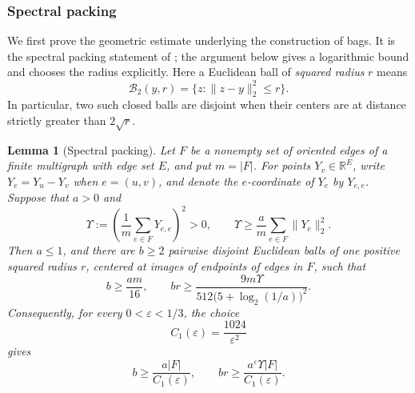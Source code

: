 \documentclass[11pt]{amsart}
\newtheorem{lemma}[theorem]{Lemma}
\theoremstyle{definition}
\theoremstyle{remark}
\numberwithin{equation}{section}
\begin{document}
\subsubsection{Spectral packing}
\label{hb:spectral-subsection}

We first prove the geometric estimate underlying the construction of
bags.  It is the spectral packing statement of
\cite[Lemma~6.4]{AOG}; the argument below gives a logarithmic bound and
chooses the radius explicitly.
Here a Euclidean ball of \emph{squared radius} \(r\) means
\[
 \mathcal B_2(y,r)=\{z:\|z-y\|_2^2\le r\}.
\]
In particular, two such closed balls are disjoint when their centers
are at distance strictly greater than \(2\sqrt r\).

\begin{lemma}[Spectral packing]\label{hb:spectral-packing}
Let \(F\) be a nonempty set of oriented edges of a finite multigraph
with edge set \(E\), and put \(m=|F|\).
For points \(Y_v\in\mathbb R^E\), write
\(Y_e=Y_u-Y_v\) when \(e=(u,v)\), and denote the \(e\)-coordinate of
\(Y_e\) by \(Y_{e,e}\).
Suppose that \(a>0\) and
\begin{equation}\label{hb:spectral-assumption}
 \Upsilon:=\left(\frac1m\sum_{e\in F}Y_{e,e}\right)^2>0,
 \qquad
 \Upsilon\ge\frac a m\sum_{e\in F}\|Y_e\|_2^2.
\end{equation}
Then \(a\le1\), and there are \(b\ge2\) pairwise disjoint Euclidean
balls of one positive squared radius \(r\), centered at images of
endpoints of edges in \(F\), such that
\begin{equation}\label{hb:spectral-logarithmic}
 b\ge\frac{am}{16},
 \qquad
 br\ge\frac{9m\Upsilon}
 {512\bigl(5+\log_2(1/a)\bigr)^2}.
\end{equation}
Consequently, for every \(0<\varepsilon<1/3\), the choice
\begin{equation}\label{hb:spectral-constant}
 C_1(\varepsilon)=\frac{1024}{\varepsilon^2}
\end{equation}
gives
\begin{equation}\label{hb:spectral-conclusion}
 b\ge\frac{a|F|}{C_1(\varepsilon)},
 \qquad
 br\ge\frac{a^\varepsilon\Upsilon|F|}{C_1(\varepsilon)}.
\end{equation}
\end{lemma}
\end{document}
